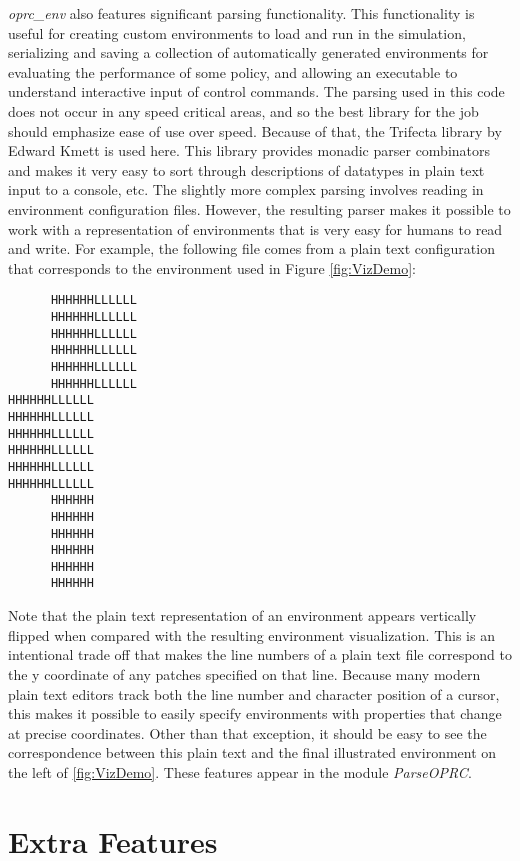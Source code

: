 \textit{oprc\_env} also features significant parsing functionality. This functionality is useful for creating custom environments to load and run in the simulation, serializing and saving a collection of automatically generated environments for evaluating the performance of some policy, and allowing an executable to understand interactive input of control commands. The parsing used in this code does not occur in any speed critical areas, and so the best library for the job should emphasize ease of use over speed. Because of that, the Trifecta library by Edward Kmett is used here. This library provides monadic parser combinators and makes it very easy to sort through descriptions of datatypes in plain text input to a console, etc. The slightly more complex parsing involves reading in environment configuration files. However, the resulting parser makes it possible to work with a representation of environments that is very easy for humans to read and write. For example, the following file comes from a plain text configuration that corresponds to the environment used in Figure \ref{fig:VizDemo}:

\begin{verbatim}
      HHHHHHLLLLLL
      HHHHHHLLLLLL
      HHHHHHLLLLLL
      HHHHHHLLLLLL
      HHHHHHLLLLLL
      HHHHHHLLLLLL
HHHHHHLLLLLL      
HHHHHHLLLLLL      
HHHHHHLLLLLL      
HHHHHHLLLLLL      
HHHHHHLLLLLL      
HHHHHHLLLLLL      
      HHHHHH      
      HHHHHH      
      HHHHHH      
      HHHHHH      
      HHHHHH      
      HHHHHH      
\end{verbatim}

Note that the plain text representation of an environment appears vertically flipped when compared with the resulting environment visualization. This is an intentional trade off that makes the line numbers of a plain text file correspond to the y coordinate of any patches specified on that line. Because many modern plain text editors track both the line number and character position of a cursor, this makes it possible to easily specify environments with properties that change at precise coordinates. Other than that exception, it should be easy to see the correspondence between this plain text and the final illustrated environment on the left of \ref{fig:VizDemo}. These features appear in the module \textit{ParseOPRC}.

\section{Extra Features}

